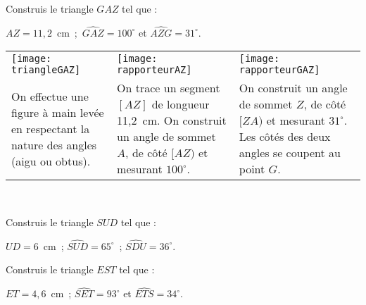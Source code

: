 \begin{methode*1}

 \begin{exemple*1}
Construis le triangle $GAZ$ tel que :

$AZ = 11,2$ cm ; $\widehat{GAZ} = 100^\circ$ et $\widehat{AZG} = 31^\circ$. \\[1em]
\begin{tabularx}{\textwidth}{X|X|X}
 \texttt{[image: triangleGAZ]} &  \texttt{[image: rapporteurAZ]} & \texttt{[image: rapporteurGAZ]} \\ 
 On effectue une figure à main levée en respectant la nature des angles (aigu ou obtus). & On trace un segment $[AZ]$ de longueur 11,2 cm. On construit un angle de sommet $A$, de côté $[AZ)$ et mesurant $100^\circ$. & On construit un angle de sommet $Z$, de côté $[ZA)$ et mesurant $31^\circ$. Les côtés des deux angles se coupent au point $G$. \\
\end{tabularx} \\

\end{exemple*1}

\exercice
Construis le triangle $SUD$ tel que :

$UD = 6$ cm ; $\widehat{SUD} = 65^\circ$ ; $\widehat{SDU} = 36^\circ$.

\exercice
Construis le triangle $EST$ tel que :

$ET = 4,6$ cm ; $\widehat{SET} = 93^\circ$ et $\widehat{ETS} = 34^\circ$.
 
\end{methode*1}



